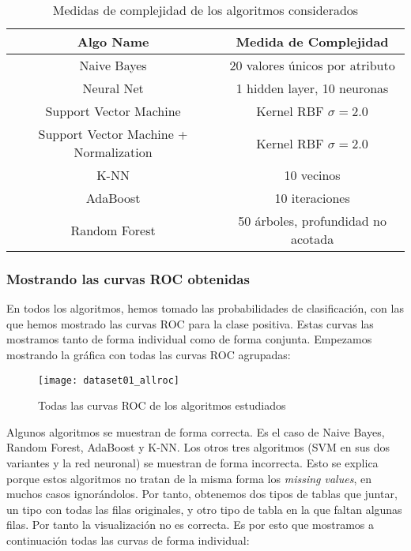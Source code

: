 \documentclass[11pt]{article}
\begin{document}
\begin{table}[H]
\begin{center}
    \begin{tabular}{|c|c|}
        \hline
        Algo Name & Medida de Complejidad \\
        \hline
        Naive Bayes& 20 valores únicos por atributo \\
        Neural Net & 1 hidden layer, 10 neuronas \\
        Support Vector Machine& Kernel RBF $\sigma = 2.0$ \\
        Support Vector Machine + Normalization& Kernel RBF $\sigma = 2.0$ \\
        K-NN& 10 vecinos \\
        AdaBoost& 10 iteraciones \\
        Random Forest& 50 árboles, profundidad no acotada \\
        \hline
    \end{tabular}
\end{center}
    \caption{Medidas de complejidad de los algoritmos considerados}
\end{table}

\pagebreak

\subsubsection{Mostrando las curvas ROC obtenidas}

En todos los algoritmos, hemos tomado las probabilidades de clasificación, con las que hemos mostrado las curvas ROC para la clase positiva. Estas curvas las mostramos tanto de forma individual como de forma conjunta. Empezamos mostrando la gráfica con todas las curvas ROC agrupadas:

\begin{figure}[H]
    \centering
    \texttt{[image: dataset01\_allroc]}
    \caption{Todas las curvas ROC de los algoritmos estudiados}
    \label{workflow_general:imagen}
\end{figure}

Algunos algoritmos se muestran de forma correcta. Es el caso de Naive Bayes, Random Forest, AdaBoost y K-NN. Los otros tres algoritmos (SVM en sus dos variantes y la red neuronal) se muestran de forma incorrecta. Esto se explica porque estos algoritmos no tratan de la misma forma los \emph{missing values}, en muchos casos ignorándolos. Por tanto, obtenemos dos tipos de tablas que juntar, un tipo con todas las filas originales, y otro tipo de tabla en la que faltan algunas filas. Por tanto la visualización no es correcta. Es por esto que mostramos a continuación todas las curvas de forma individual:
\end{document}
